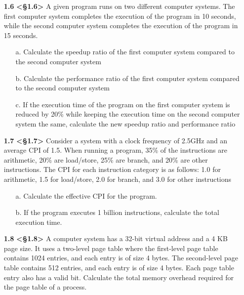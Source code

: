 \documentclass[11pt]{article}
\begin{document}
\begin{enumerate}
    \item[\textbf{1.6}] \textbf{<§1.6>} A given program runs on two different computer systems. The first computer system completes the execution of the program in 10 seconds, while the second computer system completes the execution of the program in 15 seconds.
    \begin{enumerate}
        \item[a.] Calculate the speedup ratio of the first computer system compared to the second computer system
        \item[b.] Calculate the performance ratio of the first computer system compared to the second computer system
        \item[c.] If the execution time of the program on the first computer system is reduced by 20\% while keeping the execution time on the second computer system the same, calculate the new speedup ratio and performance ratio
    \end{enumerate}
\end{enumerate}

\begin{enumerate}
    \item[\textbf{1.7}] \textbf{<§1.7>} Consider a system with a clock frequency of 2.5GHz and an average CPI of 1.5. When running a program, 35\% of the instructions are arithmetic, 20\% are load/store, 25\% are branch, and 20\% are other instructions. The CPI for each instruction category is as follows: 1.0 for arithmetic, 1.5 for load/store, 2.0 for branch, and 3.0 for other instructions
    \begin{enumerate}
        \item[a.] Calculate the effective CPI for the program.
        \item[b.] If the program executes 1 billion instructions, calculate the total execution time.
    \end{enumerate}
\end{enumerate}


\begin{enumerate}
    \item[\textbf{1.8}] \textbf{<§1.8>} A computer system has a 32-bit virtual address and a 4 KB page size. It uses a two-level page table where the first-level page table contains 1024 entries, and each entry is of size 4 bytes. The second-level page table contains 512 entries, and each entry is of size 4 bytes. Each page table entry also has a valid bit. Calculate the total memory overhead required for the page table of a process.
\end{enumerate}
\end{document}
